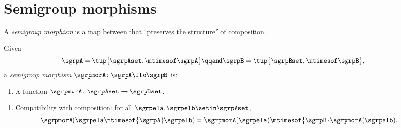 

\section{Semigroup morphisms}
\label{sec:semigroup-morphisms}



A \emph{semigroup morphism} is a map between  that ``preserves the structure'' of composition.


\begin{marginfigure}
    \centering
    \caption{Semigroup Morphism}
    \label{fig:semigroup-morphism-diagram}
\end{marginfigure}

\begin{ctdefinition}
    \label{def:semigroup-mor}
    Given 
    \begin{equation}
        \label{eq:sgrpAB}
        \sgrpA = \tup{\sgrpAset, \mtimesof\sgrpA}
        \qqand
        \sgrpB = \tup{\sgrpBset, \mtimesof\sgrpB},
    \end{equation}
    a \emph{semigroup morphism} $\sgrpmorA\colon \sgrpA \fto \sgrpB$ is:

    \constit
    \begin{enumerate}
        \item A function $\sgrpmorA\colon \sgrpAset \to \sgrpBset$.
    \end{enumerate}

    \condit
    \begin{enumerate}
        \item Compatibility with composition: for all $\sgrpela, \sgrpelb \setin \sgrpAset$,
              \begin{equation}
                  \label{eq:sgrp-mor-comp}
                  \sgrpmorA(\sgrpela \mtimesof{\sgrpA} \sgrpelb) = \sgrpmorA (\sgrpela) \mtimesof{\sgrpB} \sgrpmorA(\sgrpelb).
              \end{equation}
    \end{enumerate}
\end{ctdefinition}

